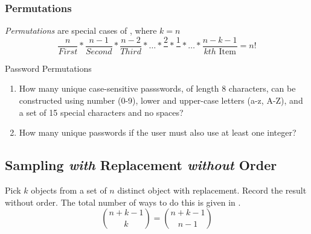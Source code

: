 		\subsubsection{Permutations} \label{subsubsec:Permutations}
			\begin{definition}[Permutation] \label{def:Permutation}
				\emph{Permutations} are special cases of , where $k = n$
				\begin{equation} \label{eq:Permutation}
					\frac{n}{First} * \frac{n-1}{Second} * \frac{n-2}{Third} * \ldots * \frac{2}{} * \frac{1}{} * \ldots * \frac{n-k-1}{kth \text{ Item}} = n!
				\end{equation}
			\end{definition}
			\begin{example}{Password Permutations}
				\begin{enumerate}
					\item How many unique case-sensitive passswords, of length 8 characters, can be constructed using number (0-9), lower and upper-case letters (a-z, A-Z), and a set of 15 special characters and no spaces?
					\item How many unique passwords if the user must also use at least one integer?
				\end{enumerate}
			\end{example}
		
	\subsection{Sampling \emph{with} Replacement \emph{without} Order} \label{subsec:Unordered Sampling with Replacement}
		\begin{definition} \label{def:Unordered Sampling without Replacement}
			Pick $k$ objects from a set of $n$ distinct object with replacement.
			Record the result without order.
			The total number of ways to do this is given in .
			\begin{equation} \label{eq:Unordered Sampling without Replacement}
				\binom{n+k-1}{k} = \binom{n+k-1}{n-1}
			\end{equation}
		\end{definition}
	
